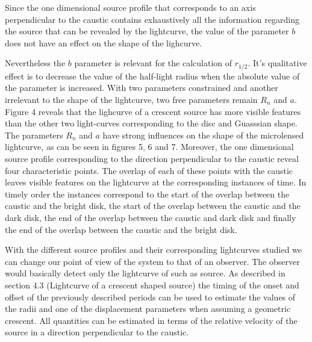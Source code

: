 Since the one dimensional source profile that corresponds to an axis perpendicular to the caustic contains exhaustively all the information regarding the source that can be revealed by the lightcurve, 
the value of the parameter $b$ does not have an effect on the shape of the lighcurve. 

Nevertheless the $b$ parameter is relevant for the calculation of $r_{1/2}$. 
It's qualitative effect is to decrease the value of the half-light radius when the absolute value of the parameter is increased.  
With two parameters constrained and another irrelevant to the shape of the lightcurve, two free parameters remain $R_n$ and $a$. 
Figure 4 reveals that the lighcurve of a crescent source has more visible features than the other two light-curves 
corresponding to the disc and Guasssian shape. The parameters $R_n$ and $a$ have strong influences on the shape of 
the microlensed lightcurve, as can be seen in figures 5, 6 and 7. Moreover, the one dimensional source profile corresponding to the direction perpendicular to the caustic reveal four characteristic points. The overlap of each of these points with the caustic leaves visible features on the lightcurve at the corresponding instances of time. In timely order the instances correspond to the start of the overlap between the caustic and the bright disk, the start of the overlap between the caustic and the dark disk, the end of the overlap between the caustic and dark disk and finally the end of the overlap between the caustic and the bright disk.          

With the different source profiles and their corresponding lightcurves studied we can change our point of view of the system to that of an observer. The observer would basically detect only the lightcurve of such as source. As described in section 4.3 (Lightcurve of a crescent shaped source) the timing of the onset and offset of the previously described periods can be used to estimate the values of the radii and one of the displacement parameters when assuming a geometric crescent. All quantities can be estimated in terms of the relative velocity of the source in a direction perpendicular to the caustic.\\

